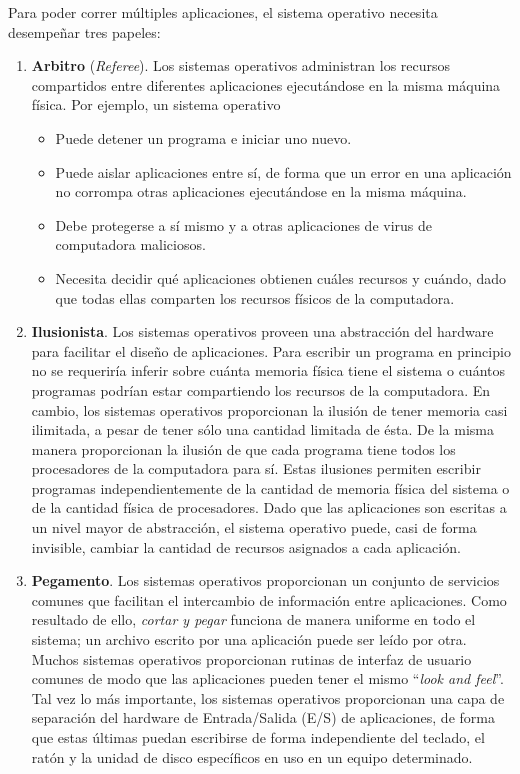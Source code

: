 \documentclass[10pt]{book}
\begin{document}
Para poder correr múltiples aplicaciones, el sistema operativo necesita desempeñar tres papeles:
\begin{enumerate}
\item \textbf{Arbitro} (\textit{Referee}). Los sistemas operativos administran los recursos compartidos entre diferentes aplicaciones ejecutándose en la misma máquina física. Por ejemplo, un sistema operativo
	\begin{itemize}
	\item Puede detener un programa e iniciar uno nuevo.
	\item Puede aislar aplicaciones entre sí, de forma que un error en una aplicación no corrompa otras aplicaciones ejecutándose en la misma máquina.
	\item Debe protegerse a sí mismo y a otras aplicaciones de virus de computadora maliciosos.
	\item Necesita decidir qué aplicaciones obtienen cuáles recursos y cuándo, dado que todas ellas comparten los recursos físicos de la computadora. 
	\end{itemize}
	
\item \textbf{Ilusionista}. Los sistemas operativos proveen una abstracción del hardware para facilitar el diseño de aplicaciones. Para escribir un programa en principio no se requeriría inferir sobre cuánta memoria física tiene el sistema o cuántos programas podrían estar compartiendo los recursos de la computadora. En cambio, los sistemas operativos proporcionan la ilusión de tener memoria casi ilimitada, a pesar de tener sólo una cantidad limitada de ésta. De la misma manera proporcionan la ilusión de que cada programa tiene todos los procesadores de la computadora para sí. Estas ilusiones permiten escribir programas independientemente de la cantidad de memoria física del sistema o de la cantidad física de procesadores. Dado que las aplicaciones son escritas a un nivel mayor de abstracción, el sistema operativo puede, casi de forma invisible, cambiar la cantidad de recursos asignados a cada aplicación.

\item \textbf{Pegamento}. Los sistemas operativos proporcionan un conjunto de servicios comunes que facilitan el intercambio de información entre aplicaciones. Como resultado de ello, \textit{cortar y pegar} funciona de manera uniforme en todo el sistema; un archivo escrito por una aplicación puede ser leído por otra. Muchos sistemas operativos proporcionan rutinas de interfaz de usuario comunes de modo que las aplicaciones pueden tener el mismo ``\textit{look and feel}''. Tal vez lo más importante, los sistemas operativos proporcionan una capa de separación del hardware de Entrada/Salida (E/S) de aplicaciones, de forma que estas últimas puedan escribirse de forma independiente del teclado, el ratón y la unidad de disco específicos en uso en un equipo determinado.
\end{enumerate}
\end{document}

